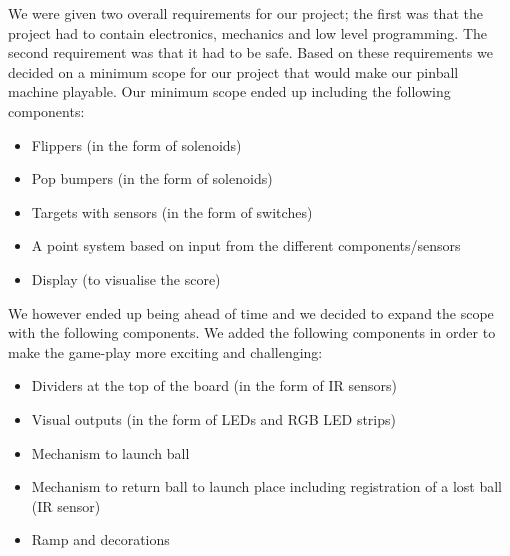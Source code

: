 We were given two overall requirements for our project; the first was that the project had to contain electronics, mechanics and low level programming. The second requirement was that it had to be safe. Based on these requirements we decided on a minimum scope for our project that would make our pinball machine playable. Our minimum scope ended up including the following components:
\begin{itemize}
    \item Flippers (in the form of solenoids)
    \item Pop bumpers (in the form of solenoids)
    \item Targets with sensors (in the form of switches)
    \item A point system based on input from the different components/sensors 
    \item Display (to visualise the score)
\end{itemize}

We however ended up being ahead of time and we decided to expand the scope with the following components. We added the following components in order to make the game-play more exciting and challenging:
\begin{itemize}
    \item Dividers at the top of the board (in the form of IR sensors)
    \item Visual outputs (in the form of LEDs and RGB LED strips)
    \item Mechanism to launch ball
    \item Mechanism to return ball to launch place including registration of a lost ball (IR sensor)
    \item Ramp and decorations
\end{itemize}

